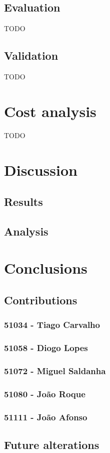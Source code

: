 \documentclass[oneside]{article}
\newcommand*\fpar{\hspace{1ex}}
\begin{document}
    \subsection{Evaluation}
    \label{sec:evaluation}
    \fpar TODO

    \subsection{Validation}
    \label{sec:validation}
    \fpar TODO

\section{Cost analysis}
\label{sec:cost}
\fpar TODO

\section{Discussion}
\label{sec:discussion}

    \subsection{Results}
    \label{sec:results}

    \subsection{Analysis}
    \label{sec:analysis}

\section{Conclusions}
\label{sec:conclusion}

    \subsection{Contributions}
    \label{sec:contributions}

      \subsubsection{51034 - Tiago Carvalho}
      \subsubsection{51058 - Diogo Lopes}
      \subsubsection{51072 - Miguel Saldanha}
      \subsubsection{51080 - João Roque}
      \subsubsection{51111 - João Afonso}

    \subsection{Future alterations}
    \label{sec:alterations}
\end{document}
